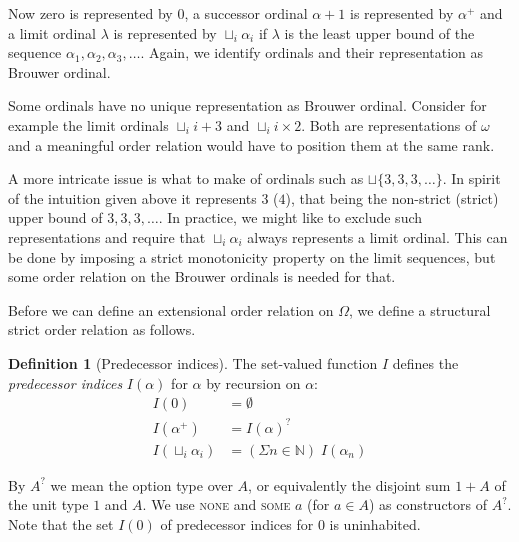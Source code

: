\documentclass[11pt,oneside,a4paper,final]{report}
\theoremstyle{definition}
\newtheorem{definition}{Definition}
\begin{document}
Now zero is represented by $0$, a successor ordinal $\alpha +1$ is represented
by $\alpha^+$ and a limit ordinal $\lambda$ is represented by $\sqcup_i
\alpha_i$ if $\lambda$ is the least upper bound of the sequence $\alpha_1,
\alpha_2, \alpha_3, \ldots$. %
Again, we identify ordinals and their representation as Brouwer ordinal.

Some ordinals have no unique representation as Brouwer ordinal. Consider for
example the limit ordinals $\sqcup_i i + 3$ and $\sqcup_i i \times 2$. Both
are representations of $\omega$ and a meaningful order relation would have to
position them at the same rank.

A more intricate issue is what to make of ordinals such as $\sqcup \{ 3, 3, 3,
\ldots \}$. In spirit of the intuition given above it represents $3$ ($4$),
that being the non-strict (strict) upper bound of $3, 3, 3, \ldots$.
In practice, we might like to exclude such representations and require that
$\sqcup_i \alpha_i$ always represents a limit ordinal. This can be done by
imposing a strict monotonicity property on the limit sequences, but some order
relation on the Brouwer ordinals is needed for that.


Before we can define an extensional order relation on $\Omega$, we define a
structural strict order relation as follows.

\begin{definition}[Predecessor indices]
The set-valued function $I$ defines the \emph{predecessor indices} $I(\alpha)$
for $\alpha$ by recursion on $\alpha$:
\begin{align*}
  I(0)                 &= \emptyset \\
  I(\alpha^+)          &= I(\alpha)^? \\
  I(\sqcup_i \alpha_i) &= (\Sigma n \in \mathbb{N}) \; I(\alpha_n)
\end{align*}
\end{definition}


By $A^?$ we mean the option type over $A$, or equivalently the disjoint sum
$1 + A$ of the unit type $1$ and $A$. We use \textsc{none} and \textsc{some
  $a$} (for $a \in A$) as constructors of $A^?$. Note that the set $I(0)$ of
predecessor indices for $0$ is uninhabited.
\end{document}
